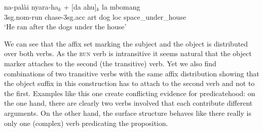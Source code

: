 \ea \label{}
\gll na-palài nyara-ha$_k$ + [da ahu]$_k$ la mbomang \\
\acs{3}\acs{sg}.\acs{nom}-run chase-\acs{3}\acs{sg}.\acs{acc} \acs{art} dog \acs{loc} space\_under\_house \\
\glft `He ran after the dogs under the house' \\ 
\z
\xe

We can see that the affix set marking the subject and the object is distributed over both verbs. As the \textsc{run} verb is intransitive it seems natural that the object marker attaches to the second (the transitive) verb. Yet we also find combinations of two transitive verbs with the same affix distribution showing that the object suffix in this construction has to attach to the second verb and not to the first. Examples like this one create conflicting evidence for predicatehood: on the one hand, there are clearly two verbs involved that each contribute different arguments. On the other hand, the surface structure behaves like there really is only one (complex) verb predicating the proposition.

